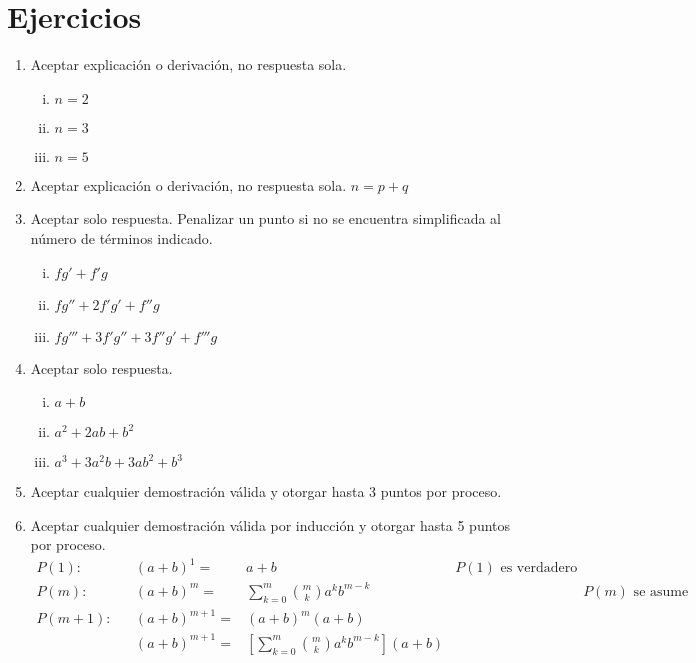 \documentclass[spanish,12pt]{article}
\begin{document}
\section{Ejercicios}
\begin{enumerate}[$a)$]
    \item Aceptar explicación o derivación, no respuesta sola.
    \begin{enumerate}[i)]
        \item $n=2$
        \item $n=3$
        \item $n=5$
    \end{enumerate}
    \item Aceptar explicación o derivación, no respuesta sola. $n=p+q$
    \item Aceptar solo respuesta. Penalizar un punto si no se encuentra simplificada al número de términos indicado.
    \begin{enumerate}[i)]
        \item $fg'+f'g$
        \item $fg''+2f'g'+f''g$
        \item $fg'''+3f'g''+3f''g'+f'''g$
    \end{enumerate}
    \item Aceptar solo respuesta.
    \begin{enumerate}[i)]
        \item $a+b$
        \item $a^2+2ab+b^2$
        \item $a^3+3a^2b+3ab^2+b^3$
    \end{enumerate}
    \item Aceptar cualquier demostración válida y otorgar hasta 3 puntos por proceso. 
    
    \item Aceptar cualquier demostración válida por inducción y otorgar hasta 5 puntos por proceso.
    \begin{align*}
        P(1): && (a+b)^1=&a+b
        &P(1)\text{ es verdadero}\tag{1}\\
        P(m): && (a+b)^m=&\sum_{k=0}^m{m\choose{k}}a^kb^{m-k} && &P(m)\text{ se asume verdadero}\tag{1}\\
        P(m+1): && (a+b)^{m+1}=&(a+b)^{m}(a+b)\tag{1}\\
        && (a+b)^{m+1}=&\left[\sum_{k=0}^m{m\choose{k}}a^kb^{m-k}\right](a+b)\tag{1}
    \end{align*}


\end{enumerate}
\end{document}
